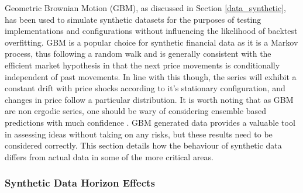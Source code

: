 \documentclass[a4paper,11pt,oneside]{article}
\theoremstyle{plain}
\theoremstyle{definition}
\begin{document}
	Geometric Brownian Motion (GBM), as discussed in Section \ref{data_synthetic}, has been used to simulate synthetic datasets for the purposes of testing implementations and configurations without influencing the likelihood of backtest overfitting. GBM is a popular choice for synthetic financial data as it is a Markov process, thus following a random walk and is generally consistent with the efficient market hypothesis in that the next price movements is conditionally independent of past movements. In line with this though, the series will exhibit a constant drift with price shocks according to it's stationary configuration, and changes in price follow a particular distribution. It is worth noting that as GBM are non ergodic series, one should be wary of considering ensemble based predictions with much confidence \citep{Peters}. GBM generated data provides a valuable tool in assessing ideas without taking on any risks, but these results need to be considered correctly. This section details how the behaviour of synthetic data differs from actual data in some of the more critical areas.
	
	\subsubsection{Synthetic Data Horizon Effects}\label{results_synthdata_mse}
	
\end{document}
